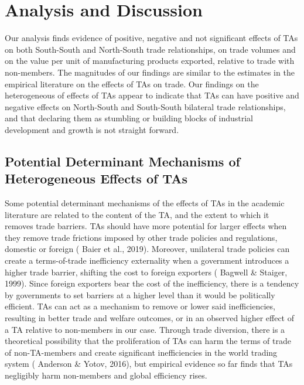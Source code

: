 \documentclass[12pt]{article}%
\begin{document}
\section{Analysis and Discussion}%
\label{sec:AnalysisandDiscussion}%
Our analysis finds evidence of positive, negative and not significant effects of TAs on both South{-}South and North{-}South trade relationships, on trade volumes and on the value per unit of manufacturing products exported, relative to trade with non{-}members. The magnitudes of our findings are similar to the estimates in the empirical literature on the effects of TAs on trade. Our findings on the heterogeneous of effects of TAs appear to indicate that TAs can have positive and negative effects on North{-}South and South{-}South bilateral trade relationships, and that declaring them as stumbling or building blocks of industrial development and growth is not straight forward.%
\subsection{Potential Determinant Mechanisms of Heterogeneous Effects of TAs }%
\label{subsec:PotentialDeterminantMechanismsofHeterogeneousEffectsofTAs}%
Some potential determinant mechanisms of the effects of TAs in the
academic literature are related to the content of the TA, and the extent
to which it removes trade barriers. TAs should have more potential for
larger effects when they remove trade frictions imposed by other trade
policies and regulations, domestic or foreign (\cite{baier_widely_2019} Baier et al., 2019).
Moreover, unilateral trade policies can create a terms-of-trade
inefficiency externality when a government introduces a higher trade
barrier, shifting the cost to foreign exporters (\cite{bagwell_economic_1999} Bagwell \& Staiger,
1999). Since foreign exporters bear the cost of the inefficiency, there
is a tendency by governments to set barriers at a higher level than it
would be politically efficient. TAs can act as a mechanism to remove or
lower said inefficiencies, resulting in better trade and welfare
outcomes, or in an observed higher effect of a TA relative to
non-members in our case. Through trade diversion, there is a theoretical
possibility that the proliferation of TAs can harm the terms of trade of
non-TA-members and create significant inefficiencies in the world
trading system (\cite{anderson_terms_2016} Anderson \& Yotov, 2016), but empirical evidence so far
finds that TAs negligibly harm non-members and global efficiency rises.
\end{document}
